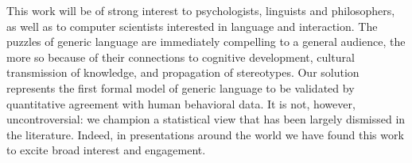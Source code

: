 \documentclass[11pt,stdletter,dateno,sigleft]{newlfm} %
\begin{document}
\begin{newlfm}
This work will be of strong interest to psychologists, linguists and philosophers, as well as to computer scientists interested in language and interaction.
The puzzles of generic language are immediately compelling to a general audience, the more so because of their connections to cognitive development, cultural transmission of knowledge, and propagation of stereotypes.
Our solution represents the first formal model of generic language to be validated by quantitative agreement with human behavioral data.
It is not, however, uncontroversial: we champion a statistical view that has been largely dismissed in the literature.
Indeed, in presentations around the world we have found this work to excite broad interest and engagement.









%



\end{newlfm}
\end{document}
